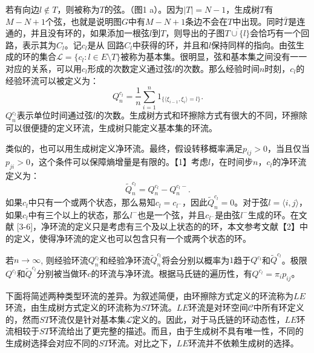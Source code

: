 若有向边$l \notin T$，则被称为$T$的弦。（图1 a）。因为$|T|= N-1$，生成树$T$有$M-N+1$个弦，也就是说明图$G$中有$M-N+1$条边不会在$T$中出现。同时$\bar{T}$是连通的，并且没有环的，如果添加一根弦$l$到$T$，则导出的子图$\overline{T \cup \{l\}}$会恰巧有一个回路，表示其为$C_l$。记$c_l$是从 回路$C_l$中获得的环，并且和$l$保持同样的指向。由弦生成的环的集合$\mathcal{L} = \{c_l: l\in E\setminus T\}$被称为基本集。很明显，弦和基本集之间没有一一对应的关系，可以用$c_l$形成的次数定义通过弦$l$的次数。那么经验时间$n$时刻，$c_l$的经验环流可以被定义为：
\begin{equation*}
    Q^{c_l}_n = \frac{1}{n}\sum_{i=1}^n1_{\{\langle\xi_{i-1},\xi_i\rangle=l\}}.
\end{equation*}
$Q^{c_l}_n$表示单位时间通过弦$l$的次数。生成树方式和环擦除方式有很大的不同，环擦除可以很便捷的定义环流，生成树只能定义基本集的环流。

类似的，也可以用生成树定义净环流。最终，假设转移概率满足$p_{ij}>0$，当且仅当$p_{ji}>0$，这个条件可以保障熵增量是有限的。【1】考虑$l
$，在时间步$n$，$c_l$的净环流定义为：
\begin{equation*}
    \tilde{Q}^{c_l}_n=Q^{c_l}_n-Q^{c_l-}_n.
\end{equation*}
如果$c_l$中只有一个或两个状态，那么易知$c_l = c_{l^-}$，因此$\tilde{Q}_n^{c_l}=0$。对于弦$l=\langle i,j \rangle$，如果$c_l$中有三个以上的状态，那么$l^-$也是一个弦，并且$c_{l^-}$是由弦$l^-$生成的环。在文献 [3-6]，净环流的定义只是考虑有三个及以上状态的的环，本文参考文献【2】中的定义，使得净环流的定义也可以包含只有一个或两个状态的环。

若$n \to \infty$, 则经验环流$Q_n^{c_l}$和经验净环流$\tilde{Q}_n^{c_l}$将会分别以概率为$1$趋于$Q^{c_l}$和$\tilde{Q}^{c_l}$。极限$Q^{c_l}$和$\tilde{Q}^{c_l}$分别被当做环$c$的环流与净环流。根据马氏链的遍历性，有$Q^{c_l} = \pi_i p_{ij}$。

下面将简述两种类型环流的差异。为叙述简便，由环擦除方式定义的环流称为$LE$环流，由生成树方式定义的环流称为$ST$环流。$LE$环流是对环空间$\mathcal{C}$中所有环定义的，然而$ST$环流仅是针对基本集$\mathcal{L}$定义的。因此，对于马氏链的环动态性，$LE$环流相较于$ST$环流给出了更完整的描述。而且，由于生成树不具有唯一性，不同的生成树选择会对应不同的$ST$环流。对比之下，$LE$环流并不依赖生成树的选择。

